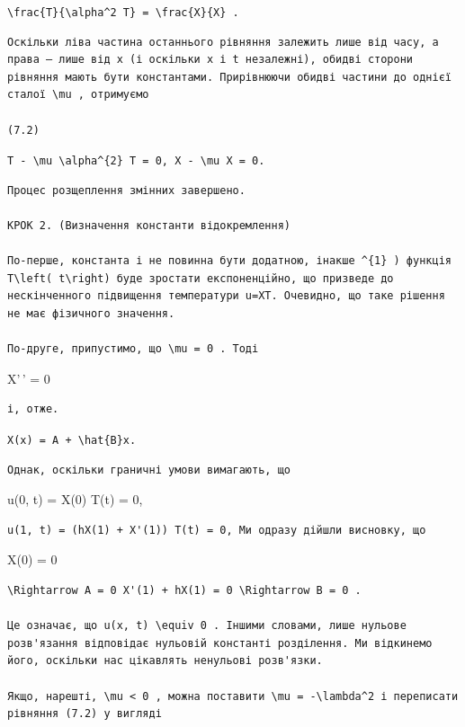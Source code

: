 \documentclass[
  ukrainian,
]{article}
\begin{document}
\texttt{\textbackslash{}frac\{T\textquotesingle{}\}\{\textbackslash{}alpha\^{}2\ T\}\ =\ \textbackslash{}frac\{X\textquotesingle{}\textquotesingle{}\}\{X\}\ .}

\begin{verbatim}
Оскільки ліва частина останнього рівняння залежить лише від часу, а права — лише від x (і оскільки x і t незалежні), обидві сторони рівняння мають бути константами. Прирівнюючи обидві частини до однієї сталої \mu , отримуємо

(7.2)
\end{verbatim}

\texttt{T\textquotesingle{}\ -\ \textbackslash{}mu\ \textbackslash{}alpha\^{}\{2\}\ T\ =\ 0,\ X\textquotesingle{}\textquotesingle{}\ -\ \textbackslash{}mu\ X\ =\ 0.}

\begin{verbatim}
Процес розщеплення змінних завершено.

КРОК 2. (Визначення константи відокремлення)

По-перше, константа і не повинна бути додатною, інакше ^{1} ) функція T\left( t\right) буде зростати експоненційно, що призведе до нескінченного підвищення температури u=XT. Очевидно, що таке рішення не має фізичного значення.

По-друге, припустимо, що \mu = 0 . Тоді
\end{verbatim}

X'\,' = 0

\begin{verbatim}
і, отже.
\end{verbatim}

\texttt{X(x)\ =\ A\ +\ \textbackslash{}hat\{B\}x.}

\begin{verbatim}
Однак, оскільки граничні умови вимагають, що
\end{verbatim}

u(0, t) = X(0) T(t) = 0,

\begin{verbatim}
u(1, t) = (hX(1) + X'(1)) T(t) = 0, Ми одразу дійшли висновку, що
\end{verbatim}

X(0) = 0

\begin{verbatim}
\Rightarrow A = 0 X'(1) + hX(1) = 0 \Rightarrow B = 0 .

Це означає, що u(x, t) \equiv 0 . Іншими словами, лише нульове розв'язання відповідає нульовій константі розділення. Ми відкинемо його, оскільки нас цікавлять ненульові розв'язки.

Якщо, нарешті, \mu < 0 , можна поставити \mu = -\lambda^2 і переписати рівняння (7.2) у вигляді
\end{verbatim}
\end{document}

